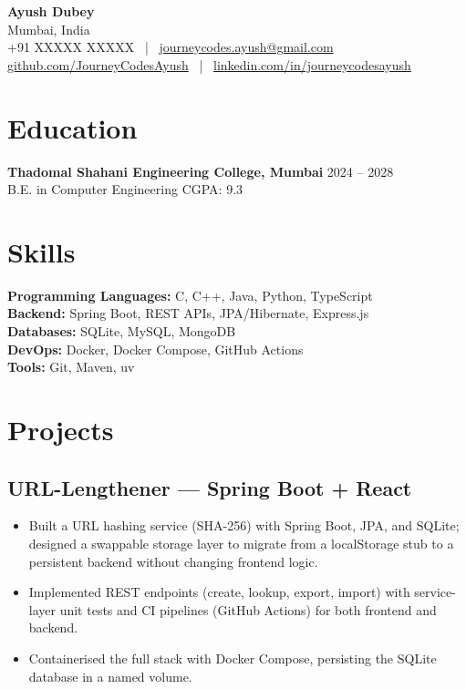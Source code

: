 \documentclass[10pt]{article}
\begin{document}
\begin{center}
    {\LARGE \textbf{Ayush Dubey}}\\
    Mumbai, India \\
    +91 XXXXX XXXXX \ | \ \href{mailto:journeycodes.ayush@gmail.com}{journeycodes.ayush@gmail.com} \\
    \href{https://github.com/JourneyCodesAyush}{github.com/JourneyCodesAyush} \ | \
    \href{https://www.linkedin.com/in/journeycodesayush}{linkedin.com/in/journeycodesayush}
\end{center}

\section*{Education}
\textbf{Thadomal Shahani Engineering College, Mumbai} \hfill 2024 -- 2028\\
B.E. in Computer Engineering \hfill CGPA: 9.3

\section*{Skills}
\textbf{Programming Languages:} C, C++, Java, Python, TypeScript \\
\textbf{Backend:} Spring Boot, REST APIs, JPA/Hibernate, Express.js \\
\textbf{Databases:} SQLite, MySQL, MongoDB \\
\textbf{DevOps:} Docker, Docker Compose, GitHub Actions \\
\textbf{Tools:} Git, Maven, uv

\section*{Projects}

\subsection*{URL-Lengthener --- Spring Boot + React}
\begin{itemize}[noitemsep]
    \item Built a URL hashing service (SHA-256) with Spring Boot, JPA, and SQLite; designed a swappable storage layer to migrate from a localStorage stub to a persistent backend without changing frontend logic.
    \item Implemented REST endpoints (create, lookup, export, import) with service-layer unit tests and CI pipelines (GitHub Actions) for both frontend and backend.
    \item Containerised the full stack with Docker Compose, persisting the SQLite database in a named volume.
\end{itemize}
\end{document}
